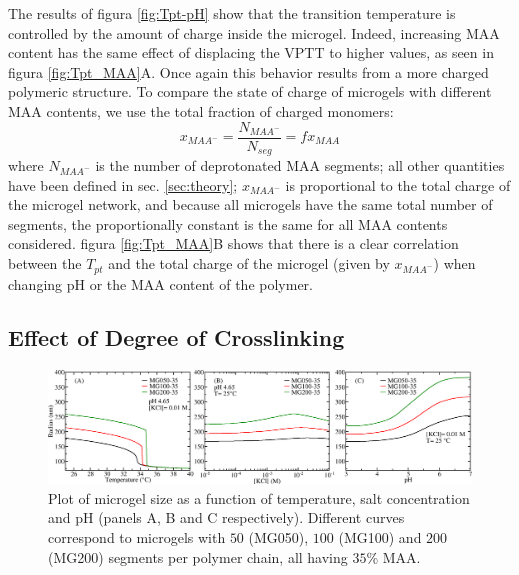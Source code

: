 The results of figura \ref{fig:Tpt-pH} show that the transition temperature is controlled by the amount of charge inside the microgel.
Indeed, increasing MAA content has the same effect of displacing the VPTT to higher values, as seen in figura  \ref{fig:Tpt_MAA}A.
Once again this behavior results from a more charged polymeric structure.
To compare the state of charge of microgels with different MAA contents, we use the total fraction of charged monomers:
%
\begin{equation}
x_{MAA^-}=\frac{N_{MAA^-}}{N_{seg}}=f x_{MAA}
\end{equation}
%
\noindent where $N_{MAA^-}$ is the number of deprotonated MAA segments; all other quantities have been defined in sec. \ref{sec:theory};
$x_{MAA^-}$ is proportional to the total charge of the microgel network, and
because all microgels have the same total number of segments, the proportionally constant is the same for all MAA contents considered.
figura \ref{fig:Tpt_MAA}B shows that there is a clear correlation between the $T_{pt}$ and the total charge of the microgel (given by $x_{MAA^-}$) when changing pH or the MAA content of the polymer.

\subsection{Effect of Degree of Crosslinking}


\begin{figure}[!tb]
	\centering
	\includegraphics[width=1\linewidth]{Figures/graph-gel/R-all_xlink.png}
	\caption{Plot of microgel size as a function of temperature, salt concentration and pH (panels A, B and C respectively). 
		Different curves correspond to microgels with $50$ (MG050), $100$ (MG100) and $200$ (MG200) segments per polymer chain, all having $35\%$ MAA.}
	\label{fig:R_xlink}
\end{figure}










